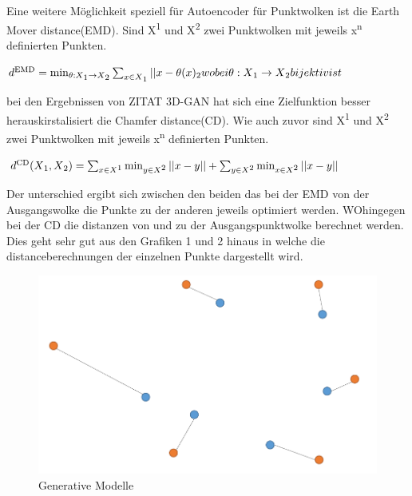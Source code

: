 \documentclass{llncs}
\begin{document}
Eine weitere Möglichkeit speziell für Autoencoder für Punktwolken ist die Earth Mover distance(EMD). Sind X\textsuperscript{1} und X\textsuperscript{2} zwei Punktwolken mit jeweils x\textsuperscript{n} definierten Punkten. 

\begin{math}
d\textsuperscript{EMD}=\min_{\theta : X\textsubscript{1}\rightarrow X\textsubscript{2}}  \sum_{x\in X\textsubscript{1}} || x - \theta(x)\textsubscript{2} wobei \theta: X\textsubscript{1} \rightarrow X\textsubscript{2} bijektiv ist 
\end{math}

bei den Ergebnissen von ZITAT 3D-GAN hat sich eine Zielfunktion besser herauskirstalisiert die Chamfer distance(CD). Wie auch zuvor sind  X\textsuperscript{1} und X\textsuperscript{2} zwei Punktwolken mit jeweils x\textsuperscript{n} definierten Punkten.

\begin{math}
d\textsuperscript{CD}(X\textsubscript{1},X\textsubscript{2})=\sum_{x\in X\textsuperscript{1}} \min_{y \in X\textsuperscript{2}}||x-y|| + \sum_{y\in X\textsuperscript{2}} \min_{x \in X\textsuperscript{2}}||x-y||
\end{math}

Der unterschied ergibt sich zwischen den beiden das bei der EMD von der Ausgangswolke die Punkte zu der anderen jeweils optimiert werden. WOhingegen bei der CD die distanzen von und zu der Ausgangspunktwolke berechnet werden. Dies geht sehr gut aus den Grafiken 1 und 2 hinaus in welche die distanceberechnungen der einzelnen Punkte dargestellt wird. 

\begin{figure}[htbp] 
	\centering
	\includegraphics[width=1.0\textwidth]{emd.png}
	\caption{Generative Modelle}
	\label{fig:Bild1}
\end{figure}
\end{document}
